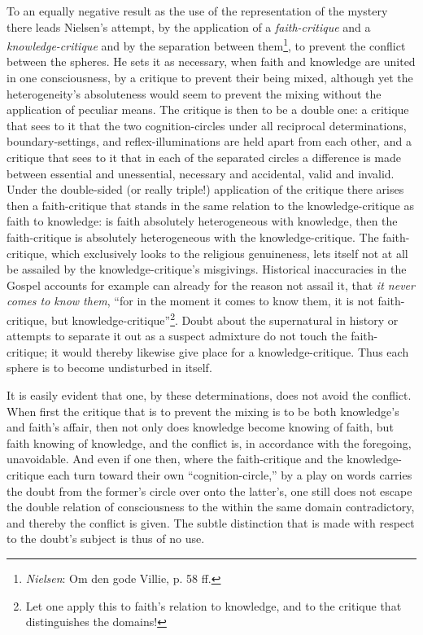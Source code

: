 \documentclass[12pt,a4paper]{book}
\begin{document}
To an equally negative result as the use of the representation of the mystery there leads Nielsen's attempt, by
the application of a \emph{faith-critique} and a \emph{knowledge-critique} and by the separation between
them\footnote{\emph{Nielsen}: Om den gode Villie, p. 58 ff.}, to prevent the conflict between the spheres. He sets it as
necessary, when faith and knowledge are united in one consciousness, by a critique to prevent their being mixed,
although yet the heterogeneity's absoluteness would seem to prevent the mixing without the application of peculiar
means. The critique is then to be a double one: a critique that sees to it that the two cognition-circles under
all reciprocal determinations, boundary-settings, and reflex-illuminations are held apart from each other, and a
critique that sees to it that in each of the separated circles a difference is made between essential and
unessential, necessary and accidental, valid and invalid. Under the double-sided (or really triple!) application
of the critique there arises then a faith-critique that stands in the same relation to the knowledge-critique as
faith to knowledge: is faith absolutely heterogeneous with knowledge, then the faith-critique is absolutely
heterogeneous with the knowledge-critique. The faith-critique, which exclusively looks to the religious
genuineness, lets itself not at all be assailed by the knowledge-critique's misgivings. Historical inaccuracies in
the Gospel accounts for example can already for the reason not assail it, that \emph{it never comes to know them}, ``for in
the moment it comes to know them, it is not faith-critique, but knowledge-critique''\footnote{Let one apply this to
faith's relation to knowledge, and to the critique that distinguishes the domains!}. Doubt about the supernatural in
history or attempts to separate it out as a suspect admixture do not touch the faith-critique; it would thereby
likewise give place for a knowledge-critique. Thus each sphere is to become undisturbed in itself.

It is easily evident that one, by these determinations, does not avoid the conflict. When first the critique that is
to prevent the mixing is to be both knowledge's and faith's affair, then not only does knowledge become knowing of
faith, but faith knowing of knowledge, and the conflict is, in accordance with the foregoing, unavoidable. And even
if one then, where the faith-critique and the knowledge-critique each turn toward their own ``cognition-circle,'' by
a play on words carries the doubt from the former's circle over onto the latter's, one still does not escape the
double relation of consciousness to the within the same domain contradictory, and thereby the conflict is given. The
subtle distinction that is made with respect to the doubt's subject is thus of no use.
\end{document}
